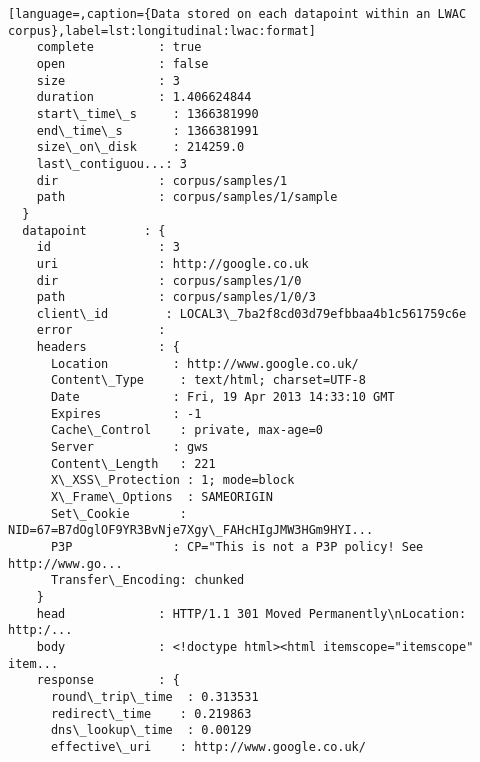 \begin{lstlisting}[language=,caption={Data stored on each datapoint within an LWAC corpus},label=lst:longitudinal:lwac:format]
    complete         : true                                              
    open             : false                                             
    size             : 3                                                 
    duration         : 1.406624844                                       
    start\_time\_s     : 1366381990                                        
    end\_time\_s       : 1366381991                                        
    size\_on\_disk     : 214259.0                                          
    last\_contiguou...: 3                                                 
    dir              : corpus/samples/1                                  
    path             : corpus/samples/1/sample                           
  }
  datapoint        : {
    id               : 3                                                 
    uri              : http://google.co.uk                               
    dir              : corpus/samples/1/0                                
    path             : corpus/samples/1/0/3                              
    client\_id        : LOCAL3\_7ba2f8cd03d79efbbaa4b1c561759c6e           
    error            :                                                   
    headers          : {
      Location         : http://www.google.co.uk/                          
      Content\_Type     : text/html; charset=UTF-8                          
      Date             : Fri, 19 Apr 2013 14:33:10 GMT                     
      Expires          : -1                                                
      Cache\_Control    : private, max-age=0                                
      Server           : gws                                               
      Content\_Length   : 221                                               
      X\_XSS\_Protection : 1; mode=block                                     
      X\_Frame\_Options  : SAMEORIGIN                                        
      Set\_Cookie       : NID=67=B7dOglOF9YR3BvNje7Xgy\_FAHcHIgJMW3HGm9HYI...
      P3P              : CP="This is not a P3P policy! See http://www.go...
      Transfer\_Encoding: chunked                                           
    }
    head             : HTTP/1.1 301 Moved Permanently\nLocation: http:/...
    body             : <!doctype html><html itemscope="itemscope" item...
    response         : {
      round\_trip\_time  : 0.313531                                          
      redirect\_time    : 0.219863                                          
      dns\_lookup\_time  : 0.00129                                           
      effective\_uri    : http://www.google.co.uk/                          

\end{lstlisting}
